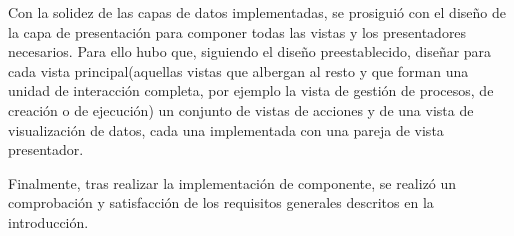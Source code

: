 Con la solidez de las capas de datos implementadas, se prosiguió con el diseño de la capa de presentación para componer todas las vistas y los presentadores necesarios. Para ello hubo que, siguiendo el diseño preestablecido, diseñar para cada vista principal(aquellas vistas que albergan al resto y que forman una unidad de interacción completa, por ejemplo la vista de gestión de procesos, de creación o de ejecución) un conjunto de vistas de acciones y de una vista de visualización de datos, cada una implementada con una pareja de vista presentador.


Finalmente, tras realizar la implementación de componente, se realizó un comprobación y satisfacción de los requisitos generales descritos en la introducción.


